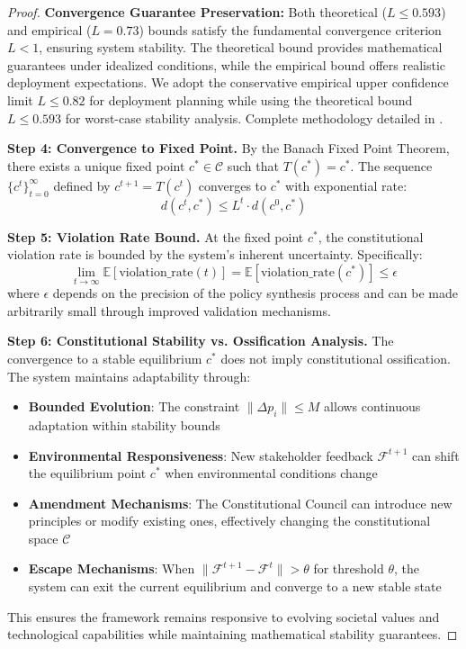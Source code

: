 \documentclass[sigconf,natbib]{acmart}
\begin{document}
\begin{proof}
\textbf{Convergence Guarantee Preservation:} Both theoretical ($L \leq 0.593$) and empirical ($L = 0.73$) bounds satisfy the fundamental convergence criterion $L < 1$, ensuring system stability. The theoretical bound provides mathematical guarantees under idealized conditions, while the empirical bound offers realistic deployment expectations. We adopt the conservative empirical upper confidence limit $L \leq 0.82$ for deployment planning while using the theoretical bound $L \leq 0.593$ for worst-case stability analysis. Complete methodology detailed in .

\textbf{Step 4: Convergence to Fixed Point.} By the Banach Fixed Point Theorem, there exists a unique fixed point $c^* \in \mathcal{C}$ such that $T(c^*) = c^*$. The sequence $\{c^t\}_{t=0}^{\infty}$ defined by $c^{t+1} = T(c^t)$ converges to $c^*$ with exponential rate:
$$d(c^t, c^*) \leq L^t \cdot d(c^0, c^*)$$

\textbf{Step 5: Violation Rate Bound.} At the fixed point $c^*$, the constitutional violation rate is bounded by the system's inherent uncertainty. Specifically:
$$\lim_{t \to \infty} \mathbb{E}[\text{violation\_rate}(t)] = \mathbb{E}[\text{violation\_rate}(c^*)] \leq \epsilon$$
where $\epsilon$ depends on the precision of the policy synthesis process and can be made arbitrarily small through improved validation mechanisms.

\textbf{Step 6: Constitutional Stability vs. Ossification Analysis.} The convergence to a stable equilibrium $c^*$ does not imply constitutional ossification. The system maintains adaptability through:
\begin{itemize}
    \item \textbf{Bounded Evolution}: The constraint $\|\Delta p_i\| \leq M$ allows continuous adaptation within stability bounds
    \item \textbf{Environmental Responsiveness}: New stakeholder feedback $\mathcal{F}^{t+1}$ can shift the equilibrium point $c^*$ when environmental conditions change
    \item \textbf{Amendment Mechanisms}: The Constitutional Council can introduce new principles or modify existing ones, effectively changing the constitutional space $\mathcal{C}$
    \item \textbf{Escape Mechanisms}: When $\|\mathcal{F}^{t+1} - \mathcal{F}^t\| > \theta$ for threshold $\theta$, the system can exit the current equilibrium and converge to a new stable state
\end{itemize}
This ensures the framework remains responsive to evolving societal values and technological capabilities while maintaining mathematical stability guarantees.
\end{proof}
\end{document}
